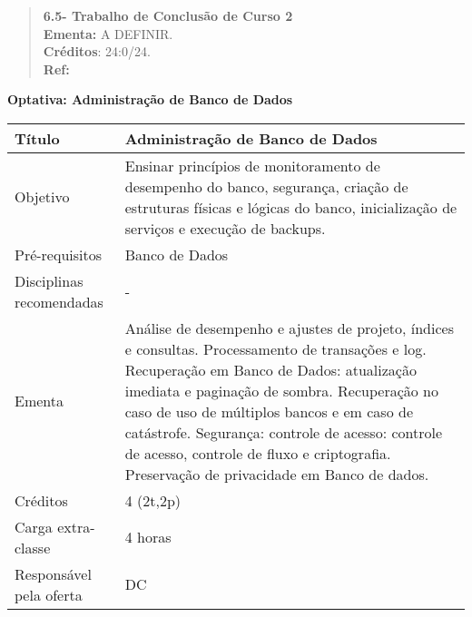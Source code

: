 \begin{quote}
\textbf{6.5- Trabalho de Conclusão de Curso 2}
\\  
\textbf{Ementa:} A DEFINIR.
\\
\textbf{Créditos}: 24:0/24.
\\
\textbf{Ref:}
\end{quote}





\textbf{Optativa: Administração de Banco de Dados}


\begin{tabular}{|p{4.5cm}|p{10.0cm}|} \hline
Título & Administração de Banco de Dados\\ \hline
Objetivo & Ensinar princípios de monitoramento de desempenho do banco, segurança, criação de estruturas físicas e lógicas do banco, inicialização de serviços e execução de backups. \\ \hline
Pré-requisitos & Banco de Dados \\ \hline
Disciplinas recomendadas & - \\ \hline
Ementa & Análise de desempenho e ajustes de projeto, índices e consultas. Processamento de transações e log. Recuperação em Banco de Dados: atualização imediata e paginação de sombra. Recuperação no caso de uso de múltiplos bancos e em caso de catástrofe. Segurança: controle de acesso: controle de acesso, controle de fluxo e criptografia. Preservação de privacidade em Banco de dados. \\ \hline
Créditos & 4 (2t,2p) \\ \hline
Carga extra-classe & 4 horas \\ \hline
Responsável pela oferta & DC \\ \hline
\end{tabular}

